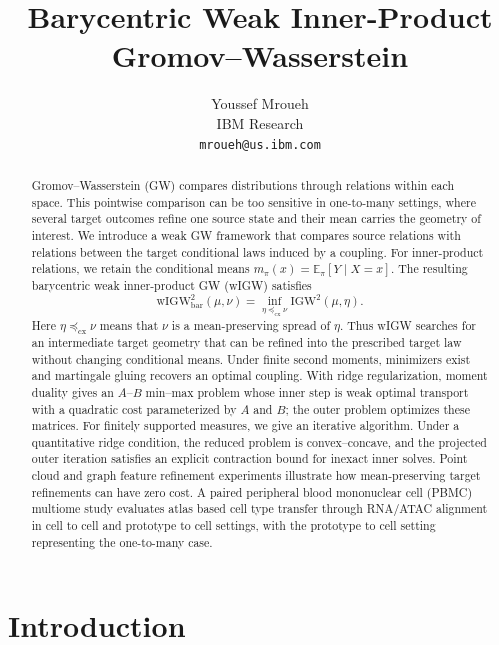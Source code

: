 \documentclass[11pt]{article}
\title{Barycentric Weak Inner-Product Gromov--Wasserstein}
\author{Youssef Mroueh\\[0.3em]
\normalsize IBM Research\\
\normalsize\texttt{mroueh@us.ibm.com}}
\date{}
\newcommand{\E}{\mathbb E}
\newcommand{\cx}{\preceq_{\mathrm{cx}}}
\newcommand{\wIGW}{\mathrm{wIGW}_{\mathrm{bar}}}
\newcommand{\IGW}{\mathrm{IGW}}
\theoremstyle{plain}
\theoremstyle{definition}
\theoremstyle{remark}
\begin{document}
\maketitle

\begin{abstract}
Gromov--Wasserstein (GW) compares distributions through relations within each space.
This pointwise comparison can be too sensitive in one-to-many settings, where several
target outcomes refine one source state and their mean carries the geometry of
interest. We introduce a weak GW framework that compares source
relations with relations between the target conditional laws induced by a coupling.
For inner-product relations, we retain the conditional means
\(m_\pi(x)=\E_\pi[Y\mid X=x]\). The resulting barycentric weak inner-product GW
(wIGW) satisfies
\[
  \wIGW^2(\mu,\nu)=\inf_{\eta\cx\nu}\IGW^2(\mu,\eta).
\]
Here \(\eta\cx\nu\) means that \(\nu\) is a mean-preserving spread of \(\eta\).
Thus wIGW searches for an intermediate target geometry that can be refined into the
prescribed target law without changing conditional means. Under finite second
moments, minimizers exist and martingale gluing recovers an optimal coupling. With
ridge regularization, moment duality gives an \(A\)--\(B\) min--max problem whose
inner step is weak optimal transport with a quadratic cost parameterized by \(A\) and
\(B\); the outer problem optimizes these matrices. For finitely supported measures,
we give an iterative algorithm. Under
a quantitative ridge condition, the reduced problem is
convex--concave, and the projected outer iteration satisfies an explicit
contraction bound for inexact inner solves. Point cloud and graph feature refinement
experiments illustrate how mean-preserving target refinements can have zero cost.
A paired peripheral blood mononuclear cell (PBMC) multiome study evaluates
atlas based cell type transfer through RNA/ATAC alignment in cell to cell and
prototype to cell settings, with the prototype to cell setting representing the
one-to-many case.
\end{abstract}

\section{Introduction}\label{sec:introduction}
\end{document}
